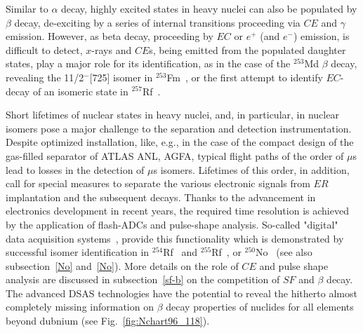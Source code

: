 Similar to $\alpha$ decay, highly excited states in heavy nuclei can also be populated by $\beta$ decay, de-exciting by a series of internal transitions proceeding via $CE$ and $\gamma$ emission. 
However, as beta decay, proceeding by $EC$ or $e^+$ (and $e^-$) emission, is difficult to detect, $x$-rays and $CE$s, being emitted from the populated daughter states, play a major role for its identification, as in the case of the $^{253}$Md $\beta$ decay, revealing the 11/2$^-$[725] isomer in $^{253}$Fm~\cite{Antalic2011}, or the first attempt to identify $EC$-decay of an isomeric state in $^{257}$Rf~\cite{Hessberger2016}.

Short lifetimes of nuclear states in heavy nuclei, and, in particular, in nuclear isomers pose a major challenge to the separation and detection instrumentation. 
Despite optimized installation, like, e.g., in the case of the compact design of the gas-filled separator of ATLAS ANL, AGFA, typical flight paths of the order of $\mu$s lead to losses in the detection of $\mu$s isomers.
Lifetimes of this order, in addition, call for special measures to separate the various electronic signals from $ER$ implantation and the subsequent decays.
Thanks to the advancement in electronics development in recent years, the required time resolution is achieved by the application of flash-ADCs and pulse-shape analysis.
So-called "digital" data acquisition systems~\cite{Jordanov1994}, provide this functionality which is demonstrated by successful isomer identification in $^{254}$Rf~\cite{David2015,Khuyagbaatar2020b} and $^{255}$Rf~\cite{Khuyagbaatar2020b},
or $^{250}$No~\cite{Kallunkathariyil2020, Khuyagbaatar2022} (see also subsection~\ref{No} and~\ref{No}).
More details on the role of $CE$ and pulse shape analysis are discussed in subsection~\ref{sf-b} on the competition of $SF$ and $\beta$ decay. 
The advanced DSAS technologies have the potential to reveal the hitherto almost completely missing information on $\beta$ decay properties of nuclides for all elements beyond dubnium (see Fig.~\ref{fig:Nchart96_118}).






